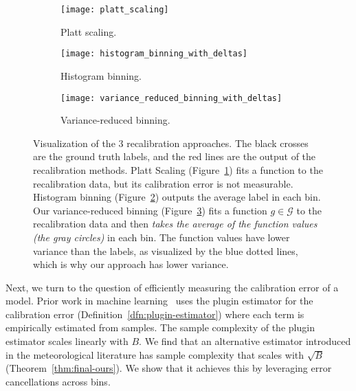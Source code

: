 \begin{figure}
     \centering
     \begin{subfigure}[b]{0.32\textwidth}
         \centering
         \texttt{[image: platt\_scaling]}
         \caption{Platt scaling.}
         \label{fig:platt_scaling}
     \end{subfigure}
     \hfill
     \begin{subfigure}[b]{0.32\textwidth}
         \centering
         \texttt{[image: histogram\_binning\_with\_deltas]}
         \caption{Histogram binning.}
         \label{fig:hist_binning}
     \end{subfigure}
     \hfill
     \begin{subfigure}[b]{0.32\textwidth}
         \centering
         \texttt{[image: variance\_reduced\_binning\_with\_deltas]}
         \caption{Variance-reduced binning.}
         \label{fig:var_red_binning}
     \end{subfigure}
        \caption{
        Visualization of the 3 recalibration approaches.
        The black crosses are the ground truth labels, and the red lines are the output of the recalibration methods.
        Platt Scaling (Figure~\ref{fig:platt_scaling}) fits a function to the recalibration data, but its calibration error is not measurable.
        Histogram binning (Figure~\ref{fig:hist_binning}) outputs the average label in each bin.
        Our variance-reduced binning (Figure~\ref{fig:var_red_binning}) fits a function $g \in \mathcal{G}$ to the recalibration data and then \emph{takes the average of the function values (the gray circles)} in each bin.
        The function values have lower variance than the labels, as visualized by the blue dotted lines, which is why our approach has lower variance. 
        }
        \label{fig:variance_reduced_illustration}
\end{figure}

Next, we turn to the question of efficiently measuring the calibration error of a model.
Prior work in machine learning~\cite{nguyen2015posterior, guo2017calibration, hendrycks2019anomaly, kuleshov2015calibrated, hendrycks2019pretraining} uses the plugin estimator for the calibration error (Definition~\ref{dfn:plugin-estimator}) where each term is empirically estimated from samples.
The sample complexity of the plugin estimator scales linearly with $B$.
We find that an alternative estimator introduced in the meteorological literature has sample complexity that scales with $\sqrt{B}$ (Theorem~\ref{thm:final-ours}).
We show that it achieves this by leveraging error cancellations across bins.

